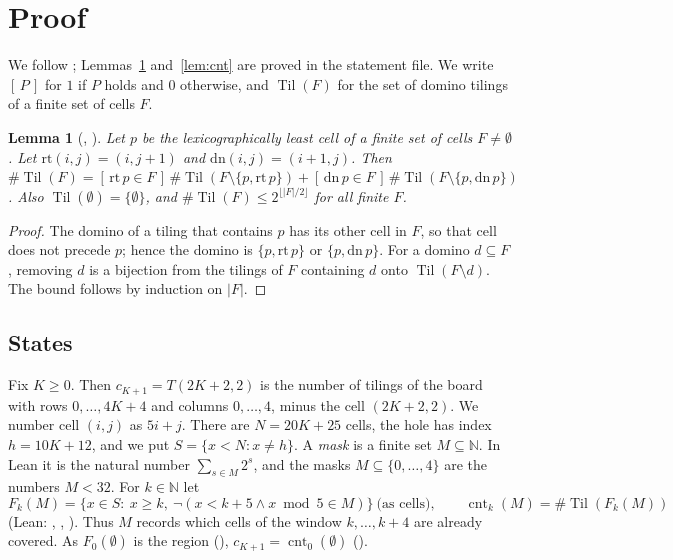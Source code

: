 \documentclass[11pt]{amsart}
\theoremstyle{plain}
\newtheorem{lemma}[theorem]{Lemma}
\theoremstyle{definition}
\newcommand{\N}{\mathbb{N}}
\newcommand{\ib}[1]{[\,#1\,]}
\newcommand{\Til}{\operatorname{Til}}
\newcommand{\cnt}{\operatorname{cnt}}
\begin{document}
\section{Proof}\label{sec:proof}

We follow ; Lemmas~\ref{lem:step} and~\ref{lem:cnt} are proved in the statement file. We write $\ib{P}$ for $1$ if $P$ holds and $0$ otherwise, and $\Til(F)$ for the set of domino tilings of a finite set of cells $F$.

\begin{lemma}[, ]\label{lem:step}
Let $p$ be the lexicographically least cell of a finite set of cells $F\neq\emptyset$. Let $\mathrm{rt}(i,j)=(i,j+1)$ and $\mathrm{dn}(i,j)=(i+1,j)$. Then
$\#\Til(F)=\ib{\mathrm{rt}\,p\in F}\,\#\Til(F\setminus\{p,\mathrm{rt}\,p\})+\ib{\mathrm{dn}\,p\in F}\,\#\Til(F\setminus\{p,\mathrm{dn}\,p\})$.
Also $\Til(\emptyset)=\{\emptyset\}$, and $\#\Til(F)\le2^{\lfloor|F|/2\rfloor}$ for all finite $F$.
\end{lemma}

\begin{proof}
The domino of a tiling that contains $p$ has its other cell in $F$, so that cell does not precede $p$; hence the domino is $\{p,\mathrm{rt}\,p\}$ or $\{p,\mathrm{dn}\,p\}$. For a domino $d\subseteq F$, removing $d$ is a bijection from the tilings of $F$ containing $d$ onto $\Til(F\setminus d)$. The bound follows by induction on $|F|$.
\end{proof}

\subsection{States}
Fix $K\ge0$. Then $c_{K+1}=T(2K+2,2)$ is the number of tilings of the board with rows $0,\dots,4K+4$ and columns $0,\dots,4$, minus the cell $(2K+2,2)$. We number cell $(i,j)$ as $5i+j$. There are $N=20K+25$ cells, the hole has index $h=10K+12$, and we put $S=\{x<N:x\ne h\}$. A \emph{mask} is a finite set $M\subseteq\N$. In Lean it is the natural number $\sum_{s\in M}2^s$, and the masks $M\subseteq\{0,\dots,4\}$ are the numbers $M<32$. For $k\in\N$ let
\[
  F_k(M)=\{x\in S:\ x\ge k,\ \neg(x<k+5\wedge x\bmod5\in M)\}\ \text{(as cells)},\qquad \cnt_k(M)=\#\Til(F_k(M))
\]
(Lean: , , ). Thus $M$ records which cells of the window $k,\dots,k+4$ are already covered. As $F_0(\emptyset)$ is the region (), $c_{K+1}=\cnt_0(\emptyset)$ ().
\end{document}
